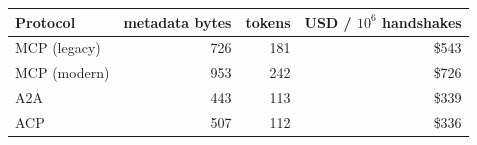 \begin{tabular}{lrrr}
\toprule
Protocol & metadata bytes & tokens & USD / $10^6$ handshakes \\
\midrule
MCP (legacy) & 726 & 181 & \$543 \\
MCP (modern) & 953 & 242 & \$726 \\
A2A & 443 & 113 & \$339 \\
ACP & 507 & 112 & \$336 \\
\bottomrule
\end{tabular}
